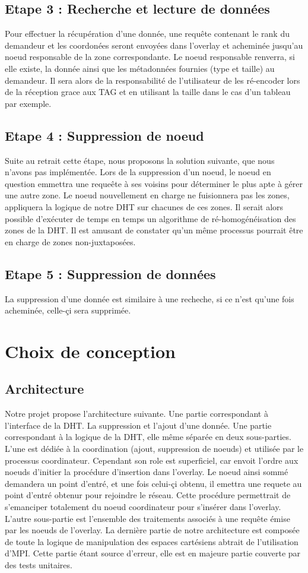 \documentclass[a4paper, 11pt, french]{article}
\begin{document}
\subsection{Etape 3 : Recherche et lecture de données}
Pour effectuer la récupération d'une donnée, une requête contenant le rank du demandeur et les coordonées seront envoyées dans l'overlay et acheminée jusqu'au noeud responsable de la zone correspondante. Le noeud responsable renverra, si elle existe, la donnée ainsi que les métadonnées fournies (type et taille) au demandeur.
Il sera alors de la responsabilité de l'utilisateur de les ré-encoder lors de la réception grace aux TAG et en utilisant la taille dans le cas d'un tableau par exemple.
\subsection{Etape 4 : Suppression de noeud}
Suite au retrait cette étape, nous proposons la solution suivante, que nous n'avons pas implémentée. Lors de la suppression d'un noeud, le noeud en question emmettra une requeête à ses voisins pour déterminer le plus apte à gérer une autre zone. Le noeud nouvellement en charge ne fuisionnera pas les zones, appliquera la logique de notre DHT sur chacunes de ces zones. Il serait alors possible d'exécuter de temps en temps un algorithme de ré-homogénéisation des zones de la DHT. Il est amusant de constater qu'un même processus pourrait être en charge de zones non-juxtaposées.
\subsection{Etape 5 : Suppression de données}
La suppression d'une donnée est similaire à une recheche, si ce n'est qu'une fois acheminée, celle-çi sera supprimée.

\section{Choix de conception}
\subsection{Architecture}
Notre projet propose l'architecture suivante. Une partie correspondant à l'interface de la DHT. La suppression et l'ajout d'une donnée. Une partie correspondant à la logique de la DHT, elle même séparée en deux sous-parties.
L'une est dédiée à la coordination (ajout, suppression de noeuds) et utilisée par le processus coordinateur. Cependant son role est superficiel, car envoit l'ordre aux noeuds d'initier la procédure d'insertion dans l'overlay. Le noeud ainsi sommé demandera un point d'entré, et une fois celui-çi obtenu, il emettra une requete au point d'entré obtenur pour rejoindre le réseau. Cette procédure permettrait de s'emanciper totalement du noeud coordinateur pour s'insérer dans l'overlay. L'autre sous-partie est l'ensemble des traitements associés à une requête émise par les noeuds de l'overlay. La dernière partie de notre architecture est composée de toute la logique de manipulation des espaces cartésiens abtrait de l'utilisation d'MPI. Cette partie étant source d'erreur, elle est en majeure partie couverte par des tests unitaires.
\end{document}
